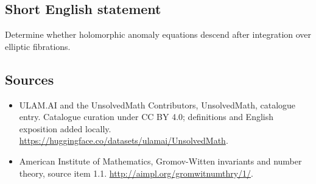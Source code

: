 \documentclass[11pt]{article}
\begin{document}
\subsection{Short English statement}
Determine whether holomorphic anomaly equations descend after integration over elliptic fibrations.
\subsection{Sources}
\begin{itemize}
\item[\hypertarget{source:statement:1}{S1}] ULAM.AI and the UnsolvedMath Contributors, UnsolvedMath, catalogue entry. Catalogue curation under CC BY 4.0; definitions and English exposition added locally.
\url{https://huggingface.co/datasets/ulamai/UnsolvedMath}.
\item[\hypertarget{source:statement:2}{S2}] American Institute of Mathematics, Gromov-Witten invariants and number theory, source item 1.1.
\url{http://aimpl.org/gromwitnumthry/1/}.
\end{itemize}
\label{end:statement}
\end{document}
